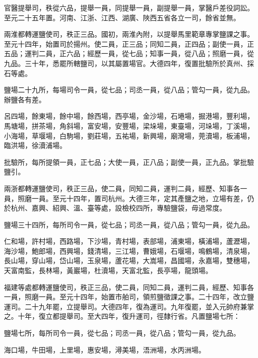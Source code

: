 \begin{pinyinscope}
 官醫提舉司，秩從六品，提舉一員，同提舉一員，副提舉一員，掌醫戶差役詞訟。至元二十五年置。河南、江浙、江西、湖廣、陜西五省各立一司，餘省並無。



 兩淮都轉運鹽使司，秩正三品。國初，兩淮內附，以提舉馬里範章專掌鹽課之事。至元十四年，始置司於揚州。使二員，正三品；同知二員，正四品；副使一員，正五品；運判二員，正六品；經歷一員，從七品；知事一員，從八品；照磨一員，從九品。三十年，悉罷所轄鹽司，以其屬置場官。大德四年，復置批驗所於真州、採石等處。



 鹽場二十九所，每場司令一員，從七品；司丞一員，從八品；管勾一員，從九品。辦鹽各有差。



 呂四場，餘東場，餘中場，餘西場，西亭場，金沙場，石塂場，掘港場，豐利場，馬塘場，拼茶場，角斜場，富安場，安豐場，梁垛場，東臺場，河垛場，丁溪場，小海場，草堰場，白駒場，劉莊場，五祐場，新興場，廟灣場，莞瀆場，板浦場，臨洪場，徐瀆浦場。



 批驗所，每所提領一員，正七品；大使一員，正八品；副使一員，正九品。掌批驗鹽引。



 兩浙都轉運鹽使司，秩正三品，使二員，同知二員，運判二員，經歷、知事各一員，照磨一員。至元十四年，置司杭州。大德三年，定其產鹽之地，立場有差，仍於杭州、嘉興、紹興、溫、臺等處，設檢校四所，專驗鹽袋，毋過常度。



 鹽場三十四所，每所司令一員，從七品；司丞一員，從八品；管勾一員，從九品。



 仁和場，許村場，西路場，下沙場，青村場，表部場，浦東場，橫浦場，蘆瀝場，海沙場，鮑郎場，西興場，錢清場，三江場，曹娥場，石堰場，鳴鶴場，清泉場，長山場，穿山場，岱山場，玉泉場，蘆花場，大嵩場，昌國場，永嘉場，雙穗場，天富南監，長林場，黃巖場，杜瀆場，天富北監，長亭場，龍頭場。



 福建等處都轉運鹽使司，秩正三品，使二員，同知二員，運判二員，經歷、知事各一員，照磨一員。至元十四年，始置市舶司，領煎鹽徵課之事。二十四年，改立鹽運司。二十九年罷，立提舉司。大德四年，復為運司。九年復罷，並入元帥府兼掌之。十年，復立都提舉司。至大四年，復升運司，徑隸行省。凡置鹽場七所：



 鹽場七所，每所司令一員，從七品；司丞一員，從八品；管勾一員，從九品。



 海口場，牛田場，上里場，惠安場，潯美場，浯洲場，水丙洲場。




\end{pinyinscope}
